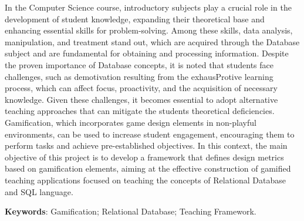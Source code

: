 \documentclass[
	12pt,				%
	openright,			%
	oneside,			%
	a4paper,			%
	chapter=TITLE,		%
	english,			%
	brazil,				%
	]{abntex2}
\renewcommand{\ABNTEXchapterfont}{\normalfont}
\begin{document}
\begin{resumo}[Abstract]
\ABNTEXchapterfont
In the Computer Science course, introductory subjects play a crucial role in the development of student knowledge, expanding their theoretical base and enhancing essential skills for problem-solving. Among these skills, data analysis, manipulation, and treatment stand out, which are acquired through the Database subject and are fundamental for obtaining and processing information. Despite the proven importance of Database concepts, it is noted that students face challenges, such as demotivation resulting from the exhausProtive learning process, which can affect focus, proactivity, and the acquisition of necessary knowledge. Given these challenges, it becomes essential to adopt alternative teaching approaches that can mitigate the students theoretical deficiencies. Gamification, which incorporates game design elements in non-playful environments, can be used to increase student engagement, encouraging them to perform tasks and achieve pre-established objectives. In this context, the main objective of this project is to develop a framework that defines design metrics based on gamification elements, aiming at the effective construction of gamified teaching applications focused on teaching the concepts of Relational Database and SQL language.


\textbf{Keywords}: Gamification; Relational Database; Teaching Framework.
\end{resumo}


\listoffigures*
\cleardoublepage


\end{document}
